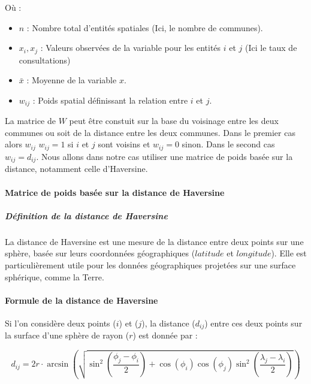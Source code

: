 \documentclass[
]{article}
\begin{document}
Où :

\begin{itemize}
\item
  \(n\) : Nombre total d'entités spatiales (Ici, le nombre de communes).
\item
  \(x_i, x_j\) : Valeurs observées de la variable pour les entités \(i\)
  et \(j\) (Ici le taux de consultations)
\item
  \(\bar{x}\) : Moyenne de la variable \(x\).
\item
  \(w_{ij}\) : Poids spatial définissant la relation entre \(i\) et
  \(j\).
\end{itemize}

La matrice de \(W\) peut être constuit sur la base du voisinage entre
les deux communes ou soit de la distance entre les deux communes. Dans
le premier cas alors \(w_{ij}\) \(w_{ij} = 1\) si \(i\) et \(j\) sont
voisins et \(w_{ij} = 0\) sinon. Dans le second cas \(w_{ij} = d_{ij}\).
Nous allons dans notre cas utiliser une matrice de poids basée sur la
distance, notamment celle d'Haversine.

\hypertarget{matrice-de-poids-basuxe9e-sur-la-distance-de-haversine}{%
\paragraph{Matrice de poids basée sur la distance de
Haversine}\label{matrice-de-poids-basuxe9e-sur-la-distance-de-haversine}}

\hypertarget{duxe9finition-de-la-distance-de-haversine}{%
\subparagraph{Définition de la distance de
Haversine}\label{duxe9finition-de-la-distance-de-haversine}}

La distance de Haversine est une mesure de la distance entre deux points
sur une sphère, basée sur leurs coordonnées géographiques (\(latitude\)
et \(longitude\)). Elle est particulièrement utile pour les données
géographiques projetées sur une surface sphérique, comme la Terre.

\hypertarget{formule-de-la-distance-de-haversine}{%
\paragraph{Formule de la distance de
Haversine}\label{formule-de-la-distance-de-haversine}}

Si l'on considère deux points (\(i\)) et (\(j\)), la distance
(\(d_{ij}\)) entre ces deux points sur la surface d'une sphère de rayon
(\(r\)) est donnée par :

\[
 d_{ij} = 2r \cdot \arcsin\left(\sqrt{\sin^2\left(\frac{\phi_j - \phi_i}{2}\right) + \cos(\phi_i)\cos(\phi_j)\sin^2\left(\frac{\lambda_j - \lambda_i}{2}\right)}\right)
\]
\end{document}
